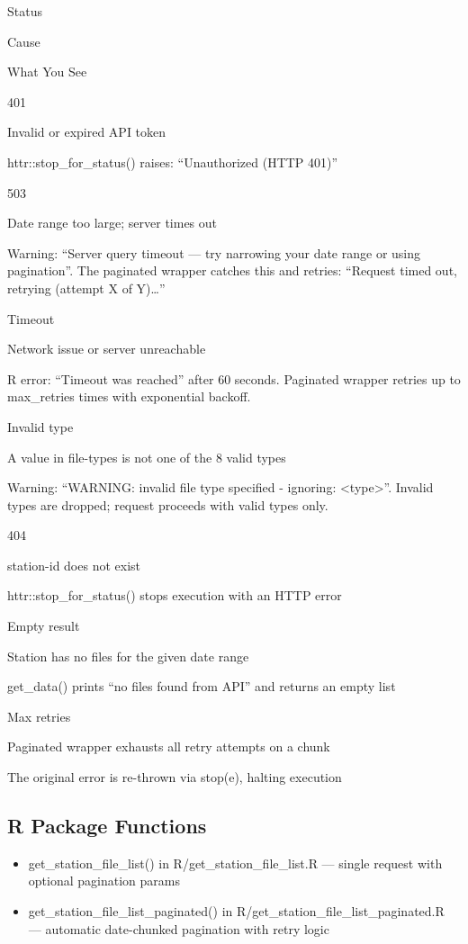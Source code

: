 \documentclass[
]{book}
\providecommand{\tightlist}{%
  \setlength{\itemsep}{0pt}\setlength{\parskip}{0pt}}
\begin{document}
Status

Cause

What You See

{401}

Invalid or expired API token

httr::stop\_for\_status() raises: ``Unauthorized (HTTP 401)''

{503}

Date range too large; server times out

Warning: ``Server query timeout --- try narrowing your date range or using pagination''. The paginated wrapper catches this and retries: ``Request timed out, retrying (attempt X of Y)\ldots{}''

{Timeout}

Network issue or server unreachable

R error: ``Timeout was reached'' after 60 seconds. Paginated wrapper retries up to max\_retries times with exponential backoff.

{Invalid type}

A value in file-types is not one of the 8 valid types

Warning: ``WARNING: invalid file type specified - ignoring: \textless type\textgreater{}''. Invalid types are dropped; request proceeds with valid types only.

{404}

station-id does not exist

httr::stop\_for\_status() stops execution with an HTTP error

{Empty result}

Station has no files for the given date range

get\_data() prints ``no files found from API'' and returns an empty list

{Max retries}

Paginated wrapper exhausts all retry attempts on a chunk

The original error is re-thrown via stop(e), halting execution

\subsection{R Package Functions}\label{r-package-functions-2}

\begin{itemize}
\tightlist
\item
  get\_station\_file\_list() in R/get\_station\_file\_list.R --- single request with optional pagination params
\item
  get\_station\_file\_list\_paginated() in R/get\_station\_file\_list\_paginated.R --- automatic date-chunked pagination with retry logic
\end{itemize}
\end{document}
